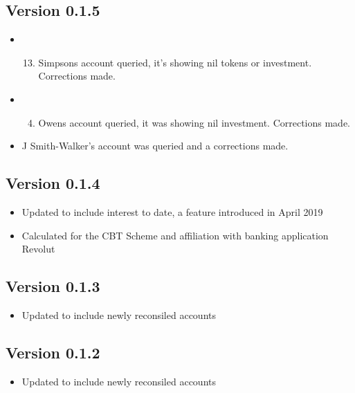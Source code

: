 \documentclass[letterpaper,10pt,openany,oneside,english]{sphinxmanual}
\begin{document}
\subsection{Version 0.1.5}
\label{\detokenize{releasenotes:version-0-1-5}}\begin{itemize}
\item {} \begin{enumerate}
\setcounter{enumi}{12}
\item {} 
Simpsons account queried, it’s showing nil tokens or investment.  Corrections made.

\end{enumerate}

\item {} \begin{enumerate}
\setcounter{enumi}{3}
\item {} 
Owens account queried, it was showing nil investment. Corrections made.

\end{enumerate}

\item {} 
J Smith-Walker’s account was queried and a corrections made.

\end{itemize}


\subsection{Version 0.1.4}
\label{\detokenize{releasenotes:version-0-1-4}}\begin{itemize}
\item {} 
Updated to include interest to date, a feature introduced in April 2019

\item {} 
Calculated for the CBT Scheme and affiliation with banking application Revolut

\end{itemize}


\subsection{Version 0.1.3}
\label{\detokenize{releasenotes:version-0-1-3}}\begin{itemize}
\item {} 
Updated to include newly reconsiled accounts

\end{itemize}


\subsection{Version 0.1.2}
\label{\detokenize{releasenotes:version-0-1-2}}\begin{itemize}
\item {} 
Updated to include newly reconsiled accounts

\end{itemize}
\end{document}
